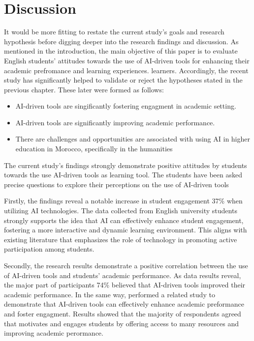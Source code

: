 \section{Discussion}
It would be more fitting to restate the current study’s goals and research hypothesis
before digging deeper into the research findings and discussion. As mentioned in the
introduction, the main objective of this paper is to evaluate English students’ attitudes towards the
use of AI-driven tools for enhancing their academic prefromance and learning experiences.
learners. Accordingly, the recent study has significantly helped
to validate or reject the hypotheses stated in the previous chapter.
These later were formed as follows:
\begin{itemize}
	\item AI-driven tools are singificantly fostering engagment in academic setting.
	\item AI-driven tools are significantly improving academic performance.
	\item There are challenges and opportunities are associated with using AI in higher education
	      in Morocco, specifically in the humanities
\end{itemize}
The current study’s findings strongly demonstrate positive attitudes by students towards
the use AI-driven tools as learning tool. The students have been asked precise questions
to explore their perceptions on the use of AI-driven tools

Firstly, the findings reveal a notable increase in student engagement 37\% when
utilizing AI technologies. The data collected from English university students
strongly supports the idea that AI can effectively enhance student engagement,
fostering a more interactive and dynamic learning environment. This aligns with
existing literature that emphasizes the role of technology in promoting active
participation among students.

Secondly, the research results demonstrate a positive correlation between the use of AI-driven tools and students' academic performance.
As data results reveal, the major part of participants 74\% believed that AI-driven tools
improved their academic performance. In the same way,
\citep{mohammed_exploring_2023} performed a related study
to demonstrate that AI-driven tools can effectively enhance
academic preformance and foster engagment. Results showed
that the majority of respondents agreed that 
motivates and engages students by offering access to
many resources and improving academic perormance.

